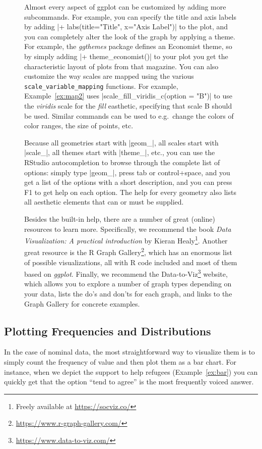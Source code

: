 \begin{figure}
\begin{feature}
Almost every aspect of ggplot can be customized by adding more subcommands. For example, you can specify the title and axis labels by adding |+ labs(title="Title", x="Axis Label")| to the plot, and you can completely alter the look of the graph by applying a theme. For example, the \emph{ggthemes} package defines an Economist theme, so by simply adding |+ theme_economist()| to your plot you get the characteristic layout of plots from that magazine.
You can also customize the way scales are mapped using the various \texttt{scale\_variable\_mapping} functions. For example, Example~\ref{ex:map2} uses |scale_fill_viridis_c(option = "B")| to use the \emph{viridis} scale for the \emph{fill} easthetic, specifying that scale B should be used. Similar commands can be used to e.g.\ change the colors of color ranges, the size of points, etc.

Because all geometries start with |geom_|, all scales start with |scale_|, all themes start with |theme_|, etc., you can use the RStudio autocompletion to browse through the complete list of options: simply type |geom_|, press tab or control+space, and you get a list of the options with a short description, and you can press F1 to get help on each option. The help for every geometry also lists all aesthetic elements that can or must be supplied.

\newcommand{\fnviza}{\footnote{Freely available at \url{https://socviz.co/}}}
\newcommand{\fnvizb}{\footnote{\url{https://www.r-graph-gallery.com/}}}
\newcommand{\fnvizc}{\footnote{\url{https://www.data-to-viz.com/}}}
\nocite{healy2018data}

Besides the built-in help, there are a number of great (online) resources to learn more. Specifically, we recommend the book \emph{Data Visualization: A practical introduction} by Kieran Healy\footnote{Freely available at \url{https://socviz.co/}}. Another great resource is the R Graph Gallery\footnote{\url{https://www.r-graph-gallery.com/}}, which has an enormous list of possible visualizations, all with R code included and most of them based on \emph{ggplot}. Finally, we recommend the Data-to-Viz\footnote{\url{https://www.data-to-viz.com/}} website, which allows you to explore a number of graph types depending on your data, lists the do's and don'ts for each graph, and links to the Graph Gallery for concrete examples.
\end{feature}
\end{figure}


\subsection{Plotting Frequencies and Distributions}
In the case of nominal data, the most straightforward way to visualize them is to simply count the frequency of value and then plot them as a bar chart. For instance, when we depict the support to help refugees (Example~\ref{ex:bar}) you can quickly get that the option ``tend to agree'' is the most frequently voiced answer.

